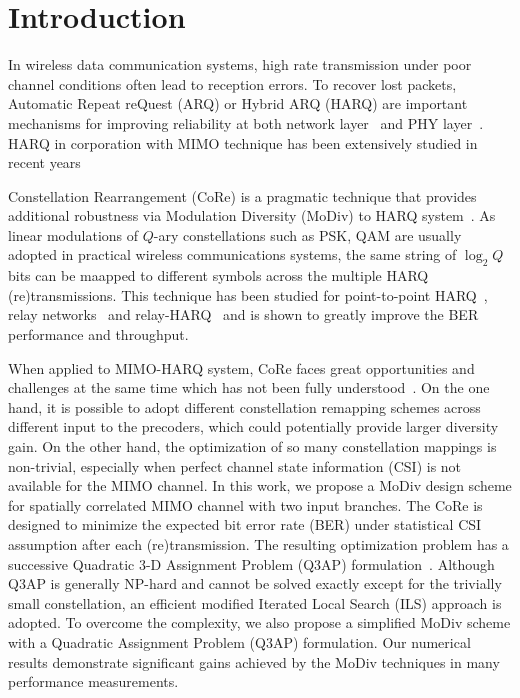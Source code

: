 \documentclass[journal,draftcls,onecolumn,12pt,twoside]{IEEEtran}
\begin{document}
\section{Introduction}
\label{sec:intro}

In wireless data communication systems, high rate transmission under poor
channel conditions often lead to reception errors. To recover lost packets,
Automatic Repeat reQuest (ARQ) or Hybrid ARQ (HARQ) are important mechanisms for
improving reliability at both network layer~\cite{TS36.331} and PHY
layer~\cite{TS36.213}. HARQ in corporation with MIMO technique has been
extensively studied in recent years~\cite{hosseini2015fast, shen2011hybrid,
sun2006progressive}

Constellation Rearrangement (CoRe) is a pragmatic technique that provides
additional robustness via Modulation Diversity (MoDiv) to HARQ
system~\cite{benelli1992new}.
As linear modulations of $Q$-ary constellations such as PSK, QAM are usually
adopted in practical wireless communications systems, the same string of
$\log_2Q$ bits can be maapped to different symbols across the multiple HARQ
(re)transmissions. This technique has been studied for point-to-point
HARQ~\cite{harvind2005symbol}, relay
networks~\cite{seddik2008trans, khormuji2008rate} and
relay-HARQ~\cite{kim2009design, ryu2011ber, wu2016modulation} and is shown to
greatly improve the BER performance and throughput.

When applied to MIMO-HARQ system, CoRe faces great opportunities and challenges
at the same time which has not been fully
understood~\cite{bahadori2014performance, zhao2009harq}. On the one hand, it is
possible to adopt different constellation remapping schemes across different input to the precoders, which could potentially provide larger
diversity gain. On the other hand, the optimization of so many constellation
mappings is non-trivial, especially when perfect channel state information (CSI)
is not available for the MIMO channel.
In this work, we propose a MoDiv design scheme for spatially correlated MIMO
channel with two input branches. The CoRe is designed to minimize the expected
bit error rate (BER) under statistical CSI assumption after each
(re)transmission. The resulting optimization problem has a successive Quadratic
3-D Assignment Problem (Q3AP) formulation~\cite{hahn2008quadratic}. Although
Q3AP is generally NP-hard and cannot be solved exactly except for the trivially small constellation, an
efficient modified Iterated Local Search (ILS) approach is adopted. To
overcome the complexity, we also propose a simplified MoDiv scheme with a 
Quadratic Assignment Problem (Q3AP) formulation. Our numerical results
demonstrate significant gains achieved by the MoDiv techniques in many
performance measurements.
\end{document}
